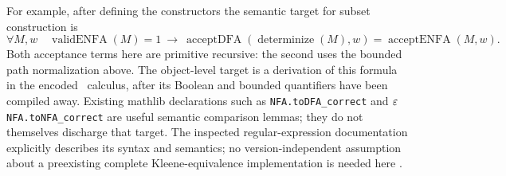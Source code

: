For example, after defining the constructors the semantic target for
subset construction is
\[
 \forall M,w\quad
 \operatorname{validENFA}(M)=1\ \longrightarrow\
 \operatorname{acceptDFA}(\operatorname{determinize}(M),w)
 =\operatorname{acceptENFA}(M,w).
\]
Both acceptance terms here are primitive recursive: the second uses the
bounded path normalization above.  The object-level target is a derivation
of this formula in the encoded \ipra\ calculus, after its Boolean and
bounded quantifiers have been compiled away.  Existing mathlib declarations
such as \texttt{NFA.toDFA\_correct} and
\texttt{\ensuremath{\eps}NFA.toNFA\_correct} are useful semantic comparison
lemmas; they do not themselves discharge that target.  The inspected
regular-expression documentation explicitly describes its syntax and
semantics; no version-independent assumption about a preexisting complete
Kleene-equivalence implementation is needed here \cite{MathlibRegex}.
